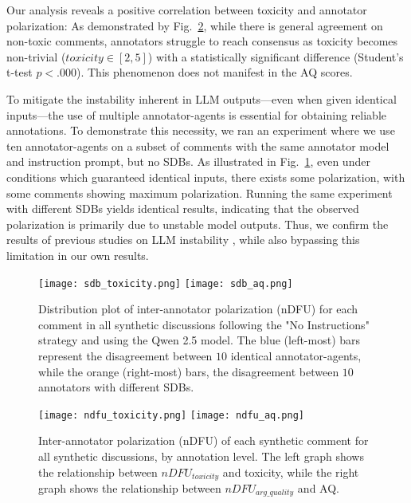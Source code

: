 Our analysis reveals a positive correlation between toxicity and annotator polarization: As demonstrated by Fig.~\ref{fig:ndfu_annot}, while there is general agreement on non-toxic comments, annotators struggle to reach consensus as toxicity becomes non-trivial ($\textit{toxicity} \in [2,5]$) with a statistically significant difference (Student's t-test $p < .000$). This phenomenon does not manifest in the \ac{AQ} scores. 

To mitigate the instability inherent in \ac{LLM} outputs—even when given identical inputs—the use of multiple annotator-agents is essential for obtaining reliable annotations. To demonstrate this necessity, we ran an experiment where we use ten annotator-agents on a subset of comments with the same annotator model and instruction prompt, but no \acp{SDB}. As illustrated in Fig.~\ref{fig:sdb_annot}, even under conditions which guaranteed identical inputs, there exists some polarization, with some comments showing maximum polarization. Running the same experiment with different \acp{SDB} yields identical results, indicating that the observed polarization is primarily due to unstable model outputs. Thus, we confirm the results of previous studies on \ac{LLM} instability \cite{rossi_2024, atil_2025}, while also bypassing this limitation in our own results.


\begin{figure}
    \texttt{[image: sdb\_toxicity.png]} \hfill
    \texttt{[image: sdb\_aq.png]}
	\centering
	\caption{Distribution plot of inter-annotator polarization (\ac{nDFU}) for each comment in all synthetic discussions following the "No Instructions" strategy and using the Qwen 2.5 model. The blue (left-most) bars represent the disagreement between $10$ identical annotator-agents, while the orange (right-most) bars, the disagreement between $10$ annotators with different \acp{SDB}.}
    \label{fig:sdb_annot}
\end{figure}

\begin{figure}
    \texttt{[image: ndfu\_toxicity.png]} \hfill
    \texttt{[image: ndfu\_aq.png]}
	\centering
	\caption{Inter-annotator polarization (\ac{nDFU}) of each synthetic comment for all synthetic discussions, by annotation level. The left graph shows the relationship between $nDFU_{toxicity}$ and toxicity, while the right graph shows the relationship between $nDFU_{arg\_quality}$ and \ac{AQ}.}
    \label{fig:ndfu_annot}
\end{figure}


